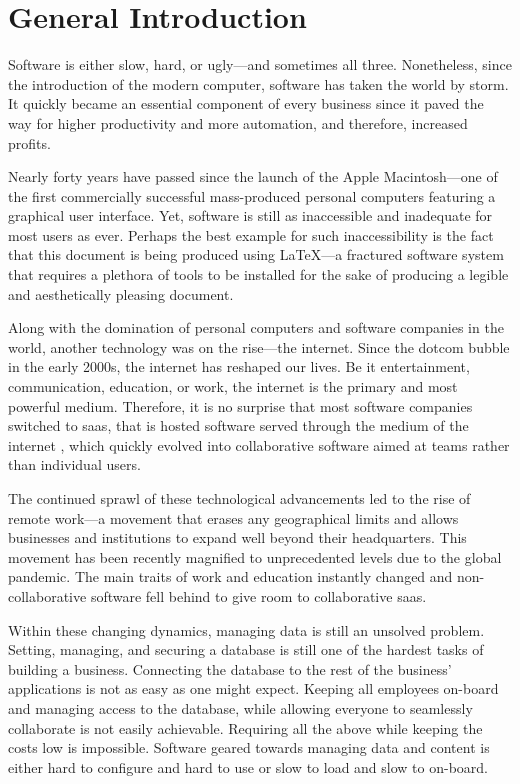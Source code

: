 \chapter*{General Introduction}

Software is either slow, hard, or ugly---and sometimes all three.
Nonetheless, since the introduction of the modern computer, software has taken the world by storm.
It quickly became an essential component of every business since it paved the way for higher productivity and more automation, and therefore, increased profits.

Nearly forty years \parencite{noauthor_macintosh_2010} have passed since the launch of the Apple Macintosh---one of the first commercially successful \parencite{polsson_chronology_2009} mass-produced personal computers featuring a graphical user interface.
Yet, software is still as inaccessible and inadequate for most users as ever.
Perhaps the best example for such inaccessibility is the fact that this document is being produced using \LaTeX---a fractured software system that requires a plethora of tools to be installed for the sake of producing a legible and aesthetically pleasing document.

Along with the domination of personal computers and software companies in the world, another technology was on the rise---the internet. Since the dotcom bubble in the early 2000s, the internet has reshaped our lives.
Be it entertainment, communication, education, or work, the internet is the primary and most powerful medium.
Therefore, it is no surprise that most software companies switched to \acrfull{saas}, that is hosted software served through the medium of the internet \cite{december_2019_what_nodate}, which quickly evolved into collaborative software aimed at teams rather than individual users.

The continued sprawl of these technological advancements led to the rise of remote work---a movement that erases any geographical limits and allows businesses and institutions to expand well beyond their headquarters. This movement has been recently magnified to unprecedented levels due to the global pandemic. The main traits of work and education instantly changed and non-collaborative software fell behind to give room to collaborative \acrshort{saas}.

Within these changing dynamics, managing data is still an unsolved problem. Setting, managing, and securing a database is still one of the hardest tasks of building a business. Connecting the database to the rest of the business' applications is not as easy as one might expect. Keeping all employees on-board and managing access to the database, while allowing everyone to seamlessly collaborate is not easily achievable. Requiring all the above while keeping the costs low is impossible. Software geared towards managing data and content is either hard to configure and hard to use or slow to load and slow to on-board.

